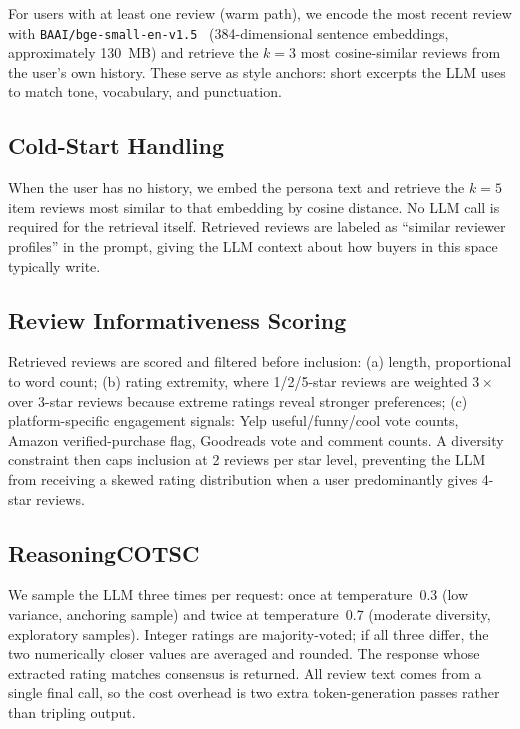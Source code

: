 \documentclass[11pt]{article}
\begin{document}
For users with at least one review (warm path), we encode the most recent
review with \texttt{BAAI/bge-small-en-v1.5}~\citep{reimers2019sentencebert}
(384-dimensional sentence embeddings, approximately 130~MB) and retrieve the
$k=3$ most cosine-similar reviews from the user's own history.
These serve as style anchors: short excerpts the LLM uses to match tone,
vocabulary, and punctuation.

\subsection{Cold-Start Handling}

When the user has no history, we embed the persona text and retrieve the
$k=5$ item reviews most similar to that embedding by cosine distance.
No LLM call is required for the retrieval itself.
Retrieved reviews are labeled as ``similar reviewer profiles'' in the prompt,
giving the LLM context about how buyers in this space typically write.

\subsection{Review Informativeness Scoring}

Retrieved reviews are scored and filtered before inclusion:
(a) length, proportional to word count;
(b) rating extremity, where 1/2/5-star reviews are weighted $3\times$ over
3-star reviews because extreme ratings reveal stronger preferences;
(c) platform-specific engagement signals: Yelp useful/funny/cool vote counts,
Amazon verified-purchase flag, Goodreads vote and comment counts.
A diversity constraint then caps inclusion at 2 reviews per star level,
preventing the LLM from receiving a skewed rating distribution when a user
predominantly gives 4-star reviews.

\subsection{ReasoningCOTSC}

We sample the LLM three times per request: once at temperature~0.3
(low variance, anchoring sample) and twice at temperature~0.7
(moderate diversity, exploratory samples).
Integer ratings are majority-voted; if all three differ, the two
numerically closer values are averaged and rounded.
The response whose extracted rating matches consensus is returned.
All review text comes from a single final call, so the cost overhead
is two extra token-generation passes rather than tripling output.
\end{document}
